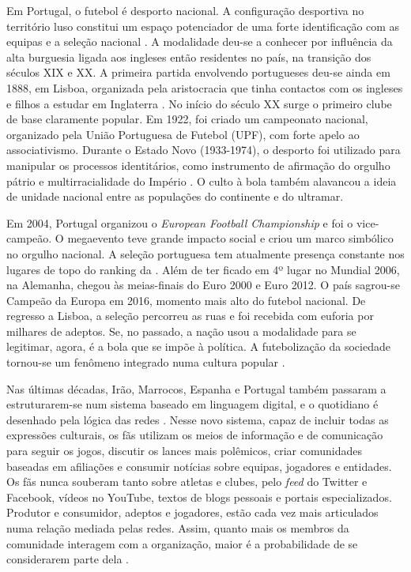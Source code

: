 \documentclass{textolivre}
\begin{document}
Em Portugal, o futebol é desporto nacional. A configuração desportiva no território luso constitui um espaço potenciador de uma forte identificação com as equipas e a seleção nacional \cite{marivoet2006}. A modalidade deu-se a conhecer por influência da alta burguesia ligada aos ingleses então residentes no país, na transição dos séculos XIX e XX. A primeira partida envolvendo portugueses deu-se ainda em 1888, em Lisboa, organizada pela aristocracia que tinha contactos com os ingleses e filhos a estudar em Inglaterra \cite{pinheiro2002}. No início do século XX surge o primeiro clube de base claramente popular. Em 1922, foi criado um campeonato nacional, organizado pela União Portuguesa de Futebol (UPF), com forte apelo ao associativismo. Durante o Estado Novo (1933-1974), o desporto foi utilizado para manipular os processos identitários, como instrumento de afirmação do orgulho pátrio e multirracialidade do Império \cite{domingos2006}. O culto à bola também alavancou a ideia de unidade nacional entre as populações do continente e do ultramar.

Em 2004, Portugal organizou o \emph{European Football Championship} e foi o vice-campeão. O megaevento teve grande impacto social e criou um marco simbólico no orgulho nacional. A seleção portuguesa tem atualmente presença constante nos lugares de topo do ranking da \textcite{fifa2021}. Além de ter ficado em 4º lugar no Mundial 2006, na Alemanha, chegou às meias-finais do Euro 2000 e Euro 2012. O país sagrou-se Campeão da Europa em 2016, momento mais alto do futebol nacional. De regresso a Lisboa, a seleção percorreu as ruas e foi recebida com euforia por milhares de adeptos. Se, no passado, a nação usou a modalidade para se legitimar, agora, é a bola que se impõe à política. A futebolização da sociedade tornou-se um fenômeno integrado numa cultura popular \cite{pinheiro2002}.

Nas últimas décadas, Irão, Marrocos, Espanha e Portugal também passaram a estruturarem-se num sistema baseado em linguagem digital, e o quotidiano é desenhado pela lógica das redes \cite{castells2007}. Nesse novo sistema, capaz de incluir todas as expressões culturais, os fãs utilizam os meios de informação e de comunicação para seguir os jogos, discutir os lances mais polêmicos, criar comunidades baseadas em afiliações e consumir notícias sobre equipas, jogadores e entidades. Os fãs nunca souberam tanto sobre atletas e clubes, pelo \emph{feed} do Twitter e Facebook, vídeos no YouTube, textos de blogs pessoais e portais especializados. Produtor e consumidor, adeptos e jogadores, estão cada vez mais articulados numa relação mediada pelas redes. Assim, quanto mais os membros da comunidade interagem com a organização, maior é a probabilidade de se considerarem parte dela \cite{ahn2014, williams2012}.
\end{document}
